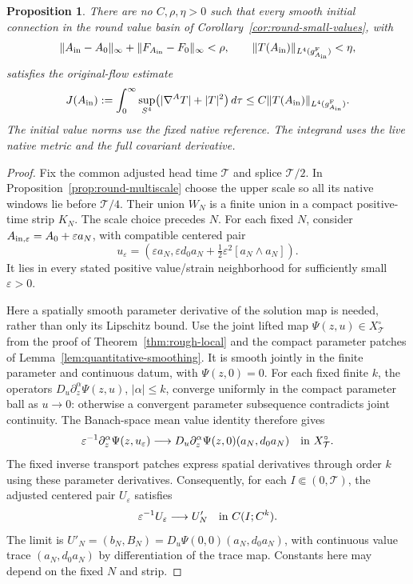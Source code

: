 \documentclass[11pt]{article}
\numberwithin{equation}{section}
\newtheorem{proposition}[theorem]{Proposition}
\theoremstyle{definition}
\theoremstyle{remark}
\begin{document}
\begin{proposition}
\label{prop:no-linear-lfour-budget}
There are no \(C,\rho,\eta>0\) such that every smooth
initial connection in the round value basin of
Corollary~\ref{cor:round-small-values}, with
\[
 \|A_{\rm in}-A_0\|_\infty+\|F_{A_{\rm in}}-F_0\|_\infty<\rho,
 \qquad
 \|T(A_{\rm in})\|_{L^4(g^{\rm F}_{A_{\rm in}})}<\eta,
\]
satisfies the original-flow estimate
\[
 J(A_{\rm in})
 :=\int_0^\infty
       \sup_{S^4}\bigl(|\nabla^AT|+|T|^2\bigr)\,d\tau
 \le C\|T(A_{\rm in})\|_{L^4(g^{\rm F}_{A_{\rm in}})} .
\]
The initial value norms use the fixed native reference.
The integrand uses the live native metric and the full
covariant derivative.
\end{proposition}

\begin{proof}
Fix the common adjusted head time \(\mathcal T\) and
splice \(\mathcal T/2\). In
Proposition~\ref{prop:round-multiscale} choose the upper
scale so all its native windows lie before \(\mathcal T/4\).
Their union \(W_N\) is a finite union in a compact
positive-time strip \(K_N\). The scale choice precedes \(N\).
For each fixed \(N\), consider \(A_{{\rm in},\varepsilon}
=A_0+\varepsilon a_N\), with compatible centered pair
\[
 u_\varepsilon
 =(\varepsilon a_N,\varepsilon d_0a_N
                  +\tfrac12\varepsilon^2[a_N\wedge a_N]).
\]
It lies in every stated positive value/strain neighborhood
for sufficiently small \(\varepsilon>0\).

Here a spatially smooth parameter derivative of the solution
map is needed, rather than only its Lipschitz bound.
Use the joint lifted map
\(\Psi(z,u)\in X_{\mathcal T}^{\circ}\) from the proof of
Theorem~\ref{thm:rough-local} and the compact parameter
patches of Lemma~\ref{lem:quantitative-smoothing}.
It is smooth jointly in the finite parameter and continuous
datum, with \(\Psi(z,0)=0\). For each fixed finite \(k\),
the operators \(D_u\partial_z^\alpha\Psi(z,u)\),
\(|\alpha|\le k\), converge uniformly in the compact
parameter ball as \(u\to0\): otherwise a convergent
parameter subsequence contradicts joint continuity.
The Banach-space mean value identity therefore gives
\[
 \varepsilon^{-1}\partial_z^\alpha\Psi(z,u_\varepsilon)
 \longrightarrow
 D_u\partial_z^\alpha\Psi(z,0)(a_N,d_0a_N)
 \quad\hbox{in }X_{\mathcal T}^{\circ}.
\]
The fixed inverse transport patches express spatial derivatives
through order \(k\) using these parameter derivatives.
Consequently, for each \(I\Subset(0,\mathcal T)\),
the adjusted centered pair \(U_\varepsilon\) satisfies
\[
 \varepsilon^{-1}U_\varepsilon\longrightarrow U'_N
                      \quad\hbox{in }C(I;C^k).
\]
The limit is
\(U'_N=(b_N,B_N)=D_u\Psi(0,0)(a_N,d_0a_N)\), with
continuous value trace \((a_N,d_0a_N)\) by differentiation
of the trace map. Constants here may depend on the fixed
\(N\) and strip.


\end{proof}
\end{document}
